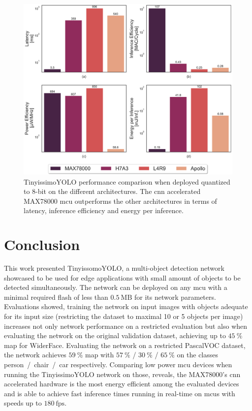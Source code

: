 \documentclass[conference]{IEEEtran}
\begin{document}
\begin{figure}[htbp]
\centerline{\includegraphics[width=\columnwidth]{tinyissimo_yolo_mcu_comparison.pdf}}
\caption{TinyissimoYOLO performance comparison when deployed quantized to 8-bit on the different architectures. The \gls{cnn} accelerated MAX78000 \gls{mcu} outperforms the other architectures in terms of latency, inference efficiency and energy per inference.}
\label{fig:dev_comparison}
\end{figure} 


\vspace{-0.35cm}
\section{Conclusion}
This work presented TinyissomoYOLO, a multi-object detection network showcased to be used for edge applications with small amount of objects to be detected simultaneously. The network can be deployed on any \gls{mcu} with a minimal required flash of less than $\SI{0.5}{\text{MB}}$ for its network parameters.\\
Evaluations showed, training the network on input images with objects adequate for its input size (restricting the dataset to maximal 10 or 5 objects per image) increases not only network performance on a restricted evaluation but also when evaluating the network on the original validation dataset, achieving up to $\SI{45}{\percent}$ \gls{map} for WiderFace. Evaluating the network on a restricted PascalVOC dataset, the network achieves $\SI{59}{\percent}$ \gls{map} with $\SI{57}{\percent}$ / $\SI{30}{\percent}$ / $\SI{65}{\percent}$ on the classes \mbox{person / chair / car} respectively. 
Comparing low power \gls{mcu} devices when running the TinyissimoYOLO network on those, reveals, the MAX78000's \gls{cnn} accelerated hardware is the most energy efficient among the evaluated devices and is able to achieve fast inference times running in real-time on \glspl{mcu} with speeds up to $\SI{180}{\text{fps}}$.




\vspace{12pt}
\end{document}
